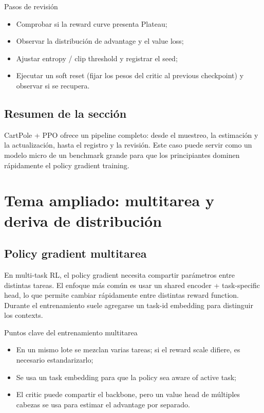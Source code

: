 \documentclass[a4paper]{article}
\begin{document}
\begin{knowledgebox}{Pasos de revisión}
\begin{itemize}
    \item Comprobar si la reward curve presenta Plateau;
    \item Observar la distribución de advantage y el value loss;
\item Ajustar entropy / clip threshold y registrar el seed;
\item Ejecutar un soft reset (fijar los pesos del critic al previous checkpoint) y observar si se recupera.
\end{itemize}
\end{knowledgebox}

\subsection{Resumen de la sección}
CartPole + PPO ofrece un pipeline completo: desde el muestreo, la estimación y la actualización, hasta el registro y la revisión. Este caso puede servir como un modelo micro de un benchmark grande para que los principiantes dominen rápidamente el policy gradient training.

\section{Tema ampliado: multitarea y deriva de distribución}
\subsection{Policy gradient multitarea}
En multi-task RL, el policy gradient necesita compartir parámetros entre distintas tareas. El enfoque más común es usar un shared encoder + task-specific head, lo que permite cambiar rápidamente entre distintas reward function. Durante el entrenamiento suele agregarse un task-id embedding para distinguir los contexts.

\begin{knowledgebox}{Puntos clave del entrenamiento multitarea}
\begin{itemize}
    \item En un mismo lote se mezclan varias tareas; si el reward scale difiere, es necesario estandarizarlo;
    \item Se usa un task embedding para que la policy sea aware of active task;
    \item El critic puede compartir el backbone, pero un value head de múltiples cabezas se usa para estimar el advantage por separado.
\end{itemize}
\end{knowledgebox}
\end{document}
